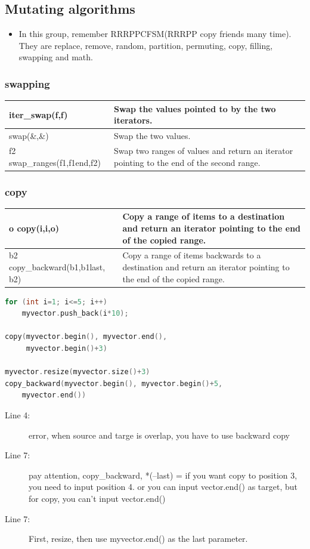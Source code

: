 \documentclass[a4paper,11pt,twoside]{book}
\newcommand{\tophline}{\hline }
\newcommand{\bottomhline}{\\ \hline }
\newcommand{\tophline}{ }
\newcommand{\bottomhline}{ }
\begin{document}
\subsection{Mutating algorithms}
\begin{itemize}


\item In this group, remember RRRPPCFSM(RRRPP copy friends many time). They are replace, remove, random, partition, permuting, copy, filling, swapping and math. 

\end{itemize}

\subsubsection{swapping}
\begin{tabular}{| p{} |p{}|}
\tophline iter\_swap(f,f) &
Swap the values pointed to by the two iterators.  \\
\tophline swap(\&,\&) &
Swap the two values.  \\
\tophline f2 swap\_ranges(f1,f1end,f2) &
Swap two ranges of values and return an iterator pointing to the end of the second range.  \bottomhline
\end{tabular}



\subsubsection{copy}

\begin{tabular}{| p{} |p{}|}
\tophline o copy(i,i,o) & Copy a range of items to a destination and return an iterator pointing to the end of the copied range.   \\
\tophline b2 copy\_backward(b1,b1last, b2)  & Copy a range of items backwards to a destination and return an iterator pointing to the end of the copied range.    \bottomhline
\end{tabular}



\begin{lstlisting}[frame=single, language=c++]
for (int i=1; i<=5; i++)
    myvector.push_back(i*10);

copy(myvector.begin(), myvector.end(),
	 myvector.begin()+3)

myvector.resize(myvector.size()+3)
copy_backward(myvector.begin(), myvector.begin()+5, 
	myvector.end())
\end{lstlisting}
\begin{description}
	\item[Line 4:] error, when source and targe is overlap, you have to use backward copy
	\item[Line 7:]pay attention, copy\_backward, *(--last) = if you want copy to position 3, you need to input position 4. or you can input vector.end() as target, but for copy, you can't input vector.end()
	\item[Line 7:]First, resize, then use myvector.end() as the last parameter.

\end{description} 
\end{document}
